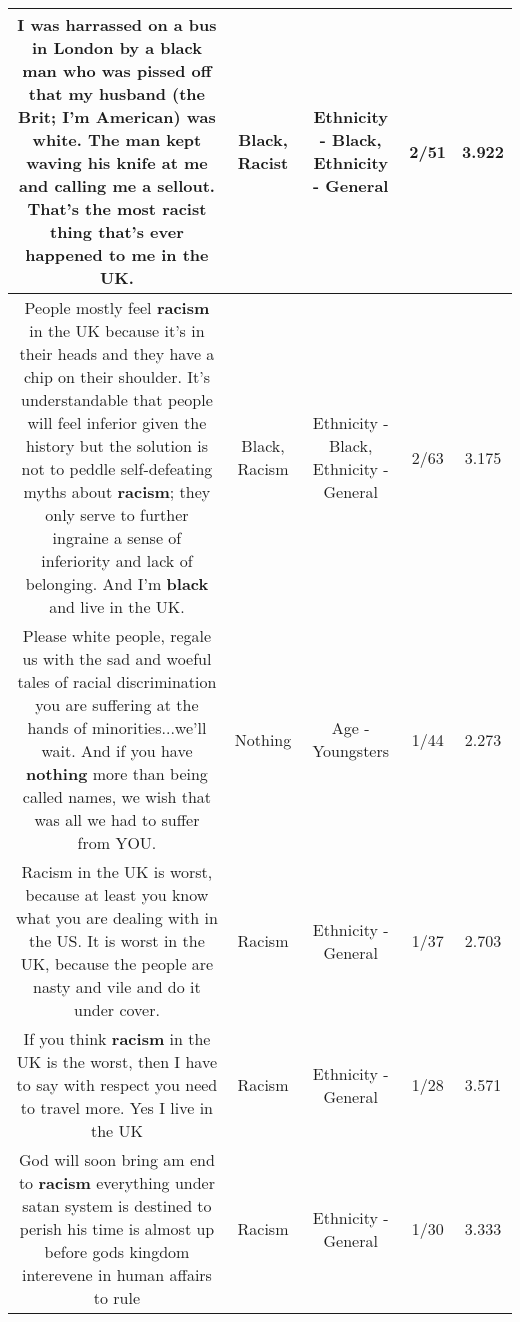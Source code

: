 \documentclass[11pt]{article}
\newlength\mylength
\begin{document}
\begin{center}
\begin{longtable}{|C{.65\mylength}|C{.30\mylength}|C{.12\mylength}|C{.12\mylength}|C{.12\mylength}|}
  \small I was harrassed on a bus in London by a \textbf{black} man who was pissed off that my husband (the Brit; I'm American) was white. The man kept waving his knife at me and calling me a sellout. That's the most \textbf{racist} thing that's ever happened to me in the UK.\normalsize   & Black, Racist & Ethnicity - Black, Ethnicity - General & 2/51 & 3.922 \\  \hline
  \small People mostly feel \textbf{racism} in the UK  because it's in their heads and they have a chip on their shoulder. It's understandable that people will feel inferior given the history but the solution is not to peddle self-defeating myths about \textbf{racism}; they only serve to further ingraine a sense of inferiority and lack of belonging. And I'm \textbf{black} and live in the UK.\normalsize   & Black, Racism & Ethnicity - Black, Ethnicity - General & 2/63 & 3.175 \\  \hline
  \small Please white people, regale us with the sad and woeful tales of racial discrimination you are suffering at the hands of minorities...we'll wait.  And if you have \textbf{nothing} more than being called names, we wish that was all we had to suffer from YOU.\normalsize   & Nothing & Age - Youngsters & 1/44 & 2.273 \\  \hline
  \small Racism in the UK is worst, because at least you know what you are dealing with in the US. It is worst in the UK, because the people are nasty and vile and do it under cover.\normalsize   & Racism & Ethnicity - General & 1/37 & 2.703 \\  \hline
  \small If you think \textbf{racism} in the UK is the worst, then I have to say with respect you need to travel more. Yes I live in the UK\normalsize   & Racism & Ethnicity - General & 1/28 & 3.571 \\  \hline
  \small God will soon bring am end to \textbf{racism} everything under satan system is destined to perish his time is almost up before gods kingdom interevene in human affairs to rule\normalsize   & Racism & Ethnicity - General & 1/30 & 3.333 \\  \hline

\end{longtable}
\end{center}
\end{document}
